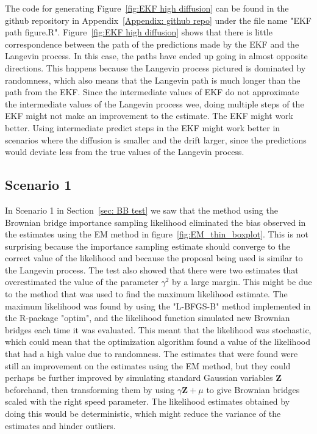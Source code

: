 The code for generating Figure~\ref{fig:EKF high diffusion} can be found in the github repository in Appendix~\ref{Appendix: github repo} under the file name "EKF path figure.R". Figure~\ref{fig:EKF high diffusion} shows that there is little correspondence between the path of the predictions made by the EKF and the Langevin process. In this case, the paths have ended up going in almost opposite directions. This happens because the Langevin process pictured is dominated by randomness, which also means that the Langevin path is much longer than the path from the EKF. Since the intermediate values of EKF do not approximate the intermediate values of the Langevin process wee, doing multiple steps of the EKF might not make an improvement to the estimate.
The EKF might work better. Using intermediate predict steps in the EKF might work better in scenarios where the diffusion is smaller and the drift larger, since the predictions would deviate less from the true values of the Langevin process.



\subsection{Scenario 1}
\label{subsec: Scenario 1 interpretation}
In Scenario 1 in Section~\ref{sec: BB test} we saw that the method using the Brownian bridge importance sampling likelihood eliminated the bias observed in the estimates using the EM method in figure~\ref{fig:EM_thin_boxplot}. This is not surprising because the importance sampling estimate should converge to the correct value of the likelihood and because the proposal being used is similar to the Langevin process. The test also showed that there were two estimates that overestimated the value of the parameter $\gamma^2$ by a large margin. This might be due to the method that was used to find the maximum likelihood estimate. The maximum likelihood was found by using the "L-BFGS-B" method implemented in the R-package "optim", and the likelihood function simulated new Brownian bridges each time it was evaluated. This meant that the likelihood was stochastic, which could mean that the optimization algorithm found a value of the likelihood that had a high value due to randomness. The estimates that were found were still an improvement on the estimates using the EM method, but they could perhaps be further improved by simulating standard Gaussian variables $\textbf{Z}$ beforehand, then transforming them by using $\gamma \textbf{Z} +\mu$ to give Brownian bridges scaled with the right speed parameter. The likelihood estimates obtained by doing this would be deterministic, which might reduce the variance of the estimates and hinder outliers.



